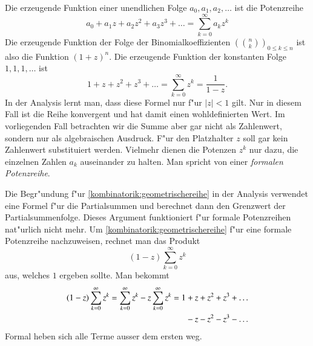 Die erzeugende Funktion einer unendlichen Folge $a_0,a_1,a_2,\dots$ ist
die Potenzreihe
\[
a_0+a_1z+a_2z^2+a_3z^3+\dots=\sum_{k=0}^\infty a_kz^k
\]
Die erzeugende Funktion der Folge der Binomialkoeffizienten $\left(\binom{n}{k}\right)_{0\le k\le  n}$ ist also die Funktion $(1+z)^n$.
Die erzeugende Funktion der konstanten Folge $1,1,1,\dots$ ist
\begin{equation}
1+z+z^2+z^3+\dots=\sum_{k=0}^\infty z^k=\frac1{1-z}.
\label{kombinatorik:geometrischereihe}
\end{equation}
In der Analysis lernt man, dass diese Formel nur f"ur $|z|<1$ gilt.
Nur in diesem Fall ist die Reihe konvergent und hat damit einen
wohldefinierten Wert.
Im vorliegenden Fall betrachten wir die Summe aber gar nicht als Zahlenwert,
sondern nur als algebraischen Ausdruck.
F"ur den Platzhalter $z$ soll gar kein Zahlenwert substituiert werden.
Vielmehr dienen die Potenzen $z^k$ nur dazu, die einzelnen Zahlen $a_k$
auseinander zu halten.
Man spricht von einer {\em formalen Potenzreihe}.

Die Begr"undung f"ur \eqref{kombinatorik:geometrischereihe} in der 
Analysis verwendet eine Formel f"ur die Partialsummen und berechnet
dann den Grenzwert der Partialsummenfolge.
Dieses Argument funktioniert f"ur formale Potenzreihen nat"urlich nicht
mehr.
Um \eqref{kombinatorik:geometrischereihe} f"ur eine formale Potenzreihe
nachzuweisen, rechnet man das Produkt
\[
(1-z)\sum_{k=0}^\infty z^k
\]
aus, welches $1$ ergeben sollte.
Man bekommt
\begin{align*}
(1-z)\sum_{k=0}^\infty z^k
=
\sum_{k=0}^\infty z^k - z\sum_{k=0}^\infty z^k
&=
1 + z + z^2 + z^3+\dots
\\
&\phantom{\mathstrut=1}
-z-z^2-z^3-\dots
\end{align*}
Formal heben sich alle Terme ausser dem ersten weg.


